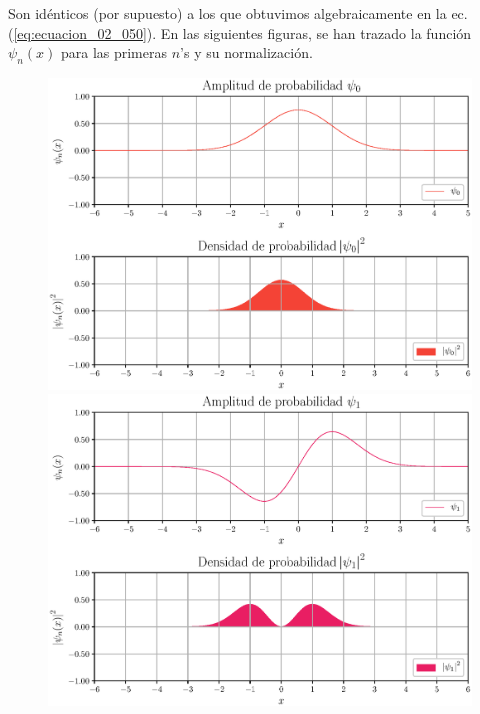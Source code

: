 Son idénticos (por supuesto) a los que obtuvimos algebraicamente en la ec. (\ref{eq:ecuacion_02_050}).
\newpage
En las siguientes figuras, se han trazado la función $\psi_{n} (x)$ para las primeras $n$'s y su normalización.
\begin{figure}[H]
    \centering
    \includegraphics[scale=0.6]{Imagenes/Funcion_Onda_00.eps}
    \includegraphics[scale=0.6]{Imagenes/Funcion_Onda_01.eps}
\end{figure}
